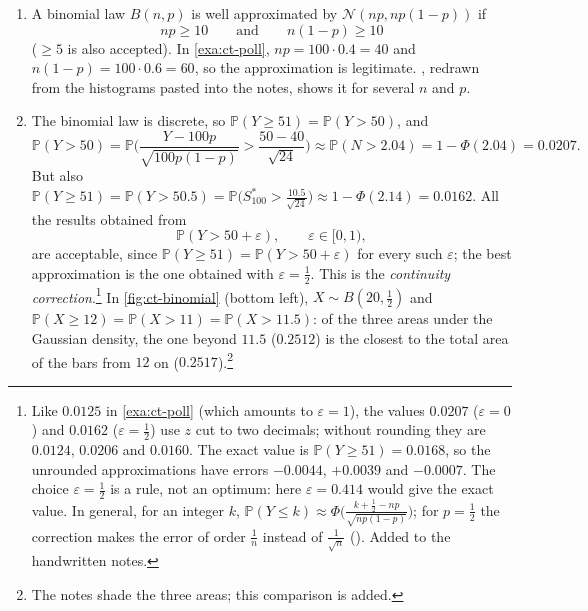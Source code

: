 \begin{remark}\label{rem:ct-normal-approximation}
\leavevmode
\begin{enumerate}[label=\arabic*)]
  \item A binomial law $B(n,p)$ is well approximated by $\mathcal N(np,np(1-p))$ if
    \[
      np\ge10\qquad\text{and}\qquad n(1-p)\ge10
    \]
    ($\ge5$ is also accepted). In \cref{exa:ct-poll}, $np=100\cdot0.4=40$ and
    $n(1-p)=100\cdot0.6=60$, so the approximation is legitimate. , redrawn
    from the histograms pasted into the notes, shows it for several $n$ and $p$.
  \item The binomial law is discrete, so $\mathbb P(Y\ge51)=\mathbb P(Y>50)$, and
    \[
      \mathbb P(Y>50)=\mathbb P\bigg(\frac{Y-100p}{\sqrt{100p(1-p)}}>\frac{50-40}{\sqrt{24}}\bigg)
      \approx\mathbb P(N>2.04)=1-\Phi(2.04)=0.0207 .
    \]
    But also $\mathbb P(Y\ge51)=\mathbb P(Y>50.5)=\mathbb P\big(S_{100}^*>\frac{10.5}{\sqrt{24}}\big)
    \approx1-\Phi(2.14)=0.0162$. All the results obtained from
    \[
      \mathbb P(Y>50+\varepsilon),\qquad\varepsilon\in[0,1),
    \]
    are acceptable, since $\mathbb P(Y\ge51)=\mathbb P(Y>50+\varepsilon)$ for every such
    $\varepsilon$; the best approximation is the one obtained with $\varepsilon=\frac12$. This is
    the \emph{continuity correction}.\footnote{Like $0.0125$ in \cref{exa:ct-poll} (which amounts to
    $\varepsilon=1$), the values $0.0207$ ($\varepsilon=0$) and $0.0162$ ($\varepsilon=\frac12$) use
    $z$ cut to two decimals; without rounding they are $0.0124$, $0.0206$ and $0.0160$. The exact
    value is $\mathbb P(Y\ge51)=0.0168$, so the unrounded approximations have errors $-0.0044$,
    $+0.0039$ and $-0.0007$. The choice $\varepsilon=\frac12$ is a rule, not an optimum: here
    $\varepsilon=0.414$ would give the exact value. In general, for an integer $k$,
    $\mathbb P(Y\le k)\approx\Phi\big(\frac{k+\frac12-np}{\sqrt{np(1-p)}}\big)$; for $p=\frac12$ the
    correction makes the error of order $\frac1n$ instead of $\frac1{\sqrt n}$
    (). Added to the handwritten notes.} In \cref{fig:ct-binomial}
    (bottom left), $X\sim B(20,\frac12)$ and $\mathbb P(X\ge12)=\mathbb P(X>11)=\mathbb P(X>11.5)$:
    of the three areas under the Gaussian density, the one beyond $11.5$ ($0.2512$) is the closest
    to the total area of the bars from $12$ on ($0.2517$).\footnote{The notes shade the three areas;
    this comparison is added.}
\end{enumerate}
\end{remark}

